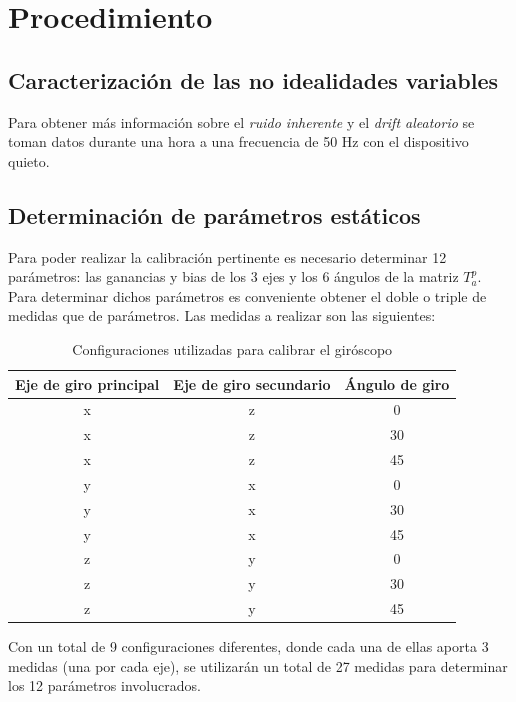 \documentclass[main]{subfiles}
\begin{document}
\section{Procedimiento}
\subsection{Caracterización de las no idealidades variables}

Para obtener más información sobre el \emph{ruido inherente} y el \emph{drift aleatorio} se toman datos durante una hora a una frecuencia de 50 Hz con el dispositivo quieto.\\

\subsection{Determinación de parámetros estáticos}

Para poder realizar la calibración pertinente es necesario determinar 12 parámetros: las ganancias y bias de los 3 ejes y los 6 ángulos de la matriz $T^p_a$. Para determinar dichos parámetros es conveniente obtener el doble o triple de medidas que de parámetros. Las medidas a realizar son las siguientes:

\begin{table}[H]
\centering
\begin{small}
\begin{tabular}{|c|c|c|}
\hline
  {\cellcolor[gray]{0.85} \centering \textbf{Eje de giro principal}}
& {\cellcolor[gray]{0.85} \centering \textbf{Eje de giro secundario}}
& {\cellcolor[gray]{0.85} \centering \textbf{Ángulo de giro}} \\ \hline  \hline
x & z & 0 \\ \hline
x & z & 30 \\ \hline
x & z & 45 \\ \hline
y & x & 0 \\ \hline
y & x & 30 \\ \hline
y & x & 45 \\ \hline
z & y & 0 \\ \hline
z & y & 30 \\ \hline
z & y & 45 \\ \hline
\end{tabular}
\caption{Configuraciones utilizadas para calibrar el giróscopo}
\label{tab:gyros}
\end{small}
\end{table} 

Con un total de 9 configuraciones diferentes, donde cada una de ellas aporta 3 medidas (una por cada eje), se utilizarán un total de 27 medidas para determinar los 12 parámetros involucrados.
\end{document}
